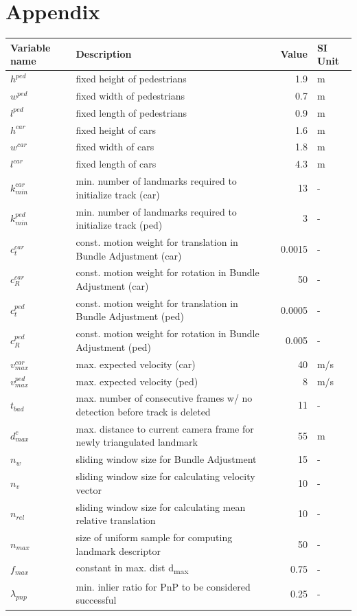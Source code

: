 \documentclass[headsepline, hidelinks, footsepline, footinclude=false, oneside, fontsize=11pt, paper=a4, listof=totoc, bibliography=totoc]{scrbook}
\begin{document}
\chapter{Appendix}
\label{sec:org975fd3e}
\begin{table}
\centering
\footnotesize
\begin{tabular}{llrl}
Variable name & Description & Value & SI Unit\\
\hline
\(h^{ped}\) & fixed height of pedestrians & 1.9 & m\\
\(w^{ped}\) & fixed width of pedestrians & 0.7 & m\\
\(l^{ped}\) & fixed length of pedestrians & 0.9 & m\\
\(h^{car}\) & fixed height of cars & 1.6 & m\\
\(w^{car}\) & fixed width of cars & 1.8 & m\\
\(l^{car}\) & fixed length of cars & 4.3 & m\\
\(k^{car}_{min}\) & min. number of landmarks required to initialize track (car) & 13 & -\\
\(k^{ped}_{min}\) & min. number of landmarks required to initialize track (ped) & 3 & -\\
\(c_t^{car}\) & const. motion weight for translation in Bundle Adjustment (car) & 0.0015 & -\\
\(c_R^{car}\) & const. motion weight for rotation in Bundle Adjustment (car) & 50 & -\\
\(c_t^{ped}\) & const. motion weight for translation in Bundle Adjustment (ped) & 0.0005 & -\\
\(c_R^{ped}\) & const. motion weight for rotation in Bundle Adjustment (ped) & 0.005 & -\\
\(v_{max}^{car}\) & max. expected velocity (car) & 40 & m/s\\
\(v_{max}^{ped}\) & max. expected velocity (ped) & 8 & m/s\\
\(t_{bad}\) & max. number of consecutive frames w/ no detection before track is deleted & 11 & -\\
\(d_{max}^{c}\) & max. distance to current camera frame for newly triangulated landmark & 55 & m\\
\(n_w\) & sliding window size for Bundle Adjustment & 15 & -\\
\(n_v\) & sliding window size for calculating velocity vector & 10 & -\\
\(n_{rel}\) & sliding window size for calculating mean relative translation & 10 & -\\
\(n_{max}\) & size of uniform sample for computing landmark descriptor & 50 & -\\
\(f_{max}\) & constant in max. dist d\textsubscript{max} & 0.75 & -\\
\(\lambda_{pnp}\) & min. inlier ratio for PnP to be considered successful & 0.25 & -\\
\end{tabular}
\label{tab:hyperparameters}

\end{table}

\listoffigures{}
\listoftables{}
\glsaddall
\printglossaries{}
\printbibliography{}
\end{document}
